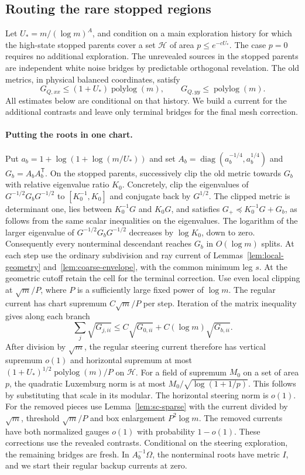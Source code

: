 \documentclass[11pt]{article}
\newcommand{\1}{\mathbf{1}}
\numberwithin{equation}{section}
\newcommand{\diag}{\operatorname{diag}}
\begin{document}
\subsection{Routing the rare stopped regions}
\label{sec:sc-backup}

Let \(U_*=m/(\log m)^A\), and condition on a main exploration
history for which the high-state stopped parents cover a set
\(\mathcal H\) of area \(p\le e^{-cU_*}\).
The case \(p=0\) requires no additional exploration.
The unrevealed sources in the stopped parents are independent
white noise bridges by predictable orthogonal revelation.
The old metrics, in physical balanced coordinates, satisfy
\[
 G_{Q,xx}\le (1+U_*)\operatorname{polylog}(m),\qquad
 G_{Q,yy}\le\operatorname{polylog}(m).
\]
All estimates below are conditional on that history.
We build a current for the additional contrasts and leave only
terminal bridges for the final mesh correction.

\paragraph{Putting the roots in one chart.}
Put \(a_b=1+\log(1+\log(m/U_*))\) and set
\(A_b=\diag(a_b^{-1/4},a_b^{1/4})\) and \(G_b=A_bA_b^{\mathsf T}\).
On the stopped parents, successively clip the old metric towards
\(G_b\) with relative eigenvalue ratio \(K_0\).
Concretely, clip the eigenvalues of \(G^{-1/2}G_bG^{-1/2}\)
to \([K_0^{-1},K_0]\) and conjugate back by \(G^{1/2}\).
The clipped metric is determinant one, lies between \(K_0^{-1}G\)
and \(K_0G\), and satisfies \(G_+\preceq K_0^{-1}G+G_b\),
as follows from the same scalar inequalities on the eigenvalues.
The logarithm of the larger eigenvalue of
\(G^{-1/2}G_bG^{-1/2}\) decreases by \(\log K_0\), down to zero.
Consequently every nonterminal descendant reaches \(G_b\) in
\(O(\log m)\) splits. At each step use the ordinary subdivision
and ray current of Lemmas~\ref{lem:local-geometry}
and~\ref{lem:coarse-envelope}, with the common minimum leg \(s\).
At the geometric cutoff retain the cell for the terminal correction.
Use even local clipping at \(\sqrt m/P\), where \(P\) is a
sufficiently large fixed power of \(\log m\).
The regular current has chart supremum \(C\sqrt m/P\) per step.
Iteration of the matrix inequality gives along each branch
\[
 \sum_j \sqrt{G_{j,ii}}\le C\sqrt{G_{0,ii}}
       +C(\log m)\sqrt{G_{b,ii}}.
\]
After division by \(\sqrt m\), the regular steering current
therefore has vertical supremum \(o(1)\) and horizontal
supremum at most
\((1+U_*)^{1/2}\operatorname{polylog}(m)/P\) on \(\mathcal H\).
For a field of supremum \(M_0\) on a set of area \(p\), the
quadratic Luxemburg norm is at most
\(M_0/\sqrt{\log(1+1/p)}\). This follows by substituting that
scale in its modular. The horizontal steering norm is \(o(1)\).
For the removed pieces use Lemma~\ref{lem:sc-sparse}
with the current divided by \(\sqrt m\), threshold \(\sqrt m/P\)
and box enlargement \(P^2\log m\). The removed currents
have both normalized gauges \(o(1)\) with probability \(1-o(1)\).
These corrections use the revealed contrasts. Conditional
on the steering exploration, the remaining bridges are fresh.
In \(A_b^{-1}\Omega\), the nonterminal roots have metric \(I\),
and we start their regular backup currents at zero.
\end{document}
